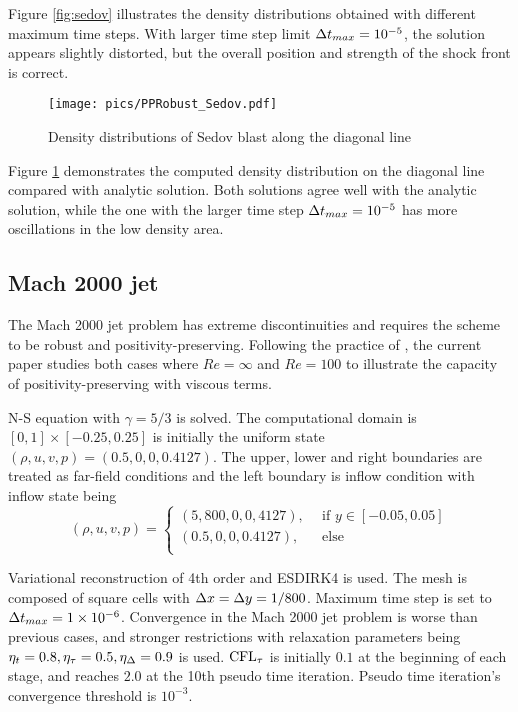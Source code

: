 Figure \ref{fig:sedov} illustrates the density distributions
obtained with different maximum time steps. 
With larger time step limit $\mathrm\Delta t_{max}=10^{-5}$, the 
solution appears slightly distorted, but the overall 
position and strength of the shock front is correct.

\begin{figure}[htbp]
    \centering
    \texttt{[image: pics/PPRobust\_Sedov.pdf]}
    \caption{Density distributions of Sedov blast along the diagonal line}
    \label{fig:sedovLine}
\end{figure}

Figure \ref{fig:sedovLine} demonstrates the computed  
density distribution on the diagonal line compared with analytic solution.
Both solutions agree well with the analytic solution,
while the one with the larger time step $\mathrm\Delta t_{max}=10^{-5}$
has more oscillations in the low density area.




\subsection{Mach 2000 jet}

The Mach 2000 jet problem \cite{zhang2010positivity}
has extreme discontinuities and requires the 
scheme to be robust and positivity-preserving.
Following the practice of \cite{huang2024general}, 
the current paper studies both  cases where 
$Re=\infty$ and $Re=100$ to illustrate 
the capacity of positivity-preserving with viscous terms.

N-S equation with $\gamma=5/3$ is solved.
The computational domain is $[0,1]\times[-0.25,0.25]$ is initially the 
uniform state $(\rho,u,v,p)=(0.5,0,0,0.4127)$.
The upper, lower and right boundaries are treated as 
far-field conditions and the left boundary is inflow
condition with inflow state being 
\begin{equation}
    (\rho,u,v,p) = \left\{
        \begin{array}{ll}
            (5,800,0,0,4127),\ \ & \text{if } y\in[-0.05,0.05] \\
            (0.5,0,0,0.4127),\ \ & \text{else}\\
        \end{array}
    \right.
\end{equation}

Variational reconstruction of 4th order and ESDIRK4 is used.
The mesh is composed of square cells with $\mathrm\Delta x = \mathrm\Delta y = 1/800$.
Maximum time step is set to $\mathrm\Delta t_{max} = 1\times10^{-6}$. 
Convergence in the Mach 2000 jet problem is worse than
previous cases, and stronger restrictions with relaxation 
parameters being 
$\eta_t= 0.8, \eta_\tau=0.5, \eta_\mathrm\Delta=0.9$ is used.
$\text{CFL}_\tau$ is initially $0.1$ at the beginning of each stage,
and reaches $2.0$ at the 10th pseudo time iteration. 
Pseudo time iteration's convergence threshold is $10^{-3}$. 

